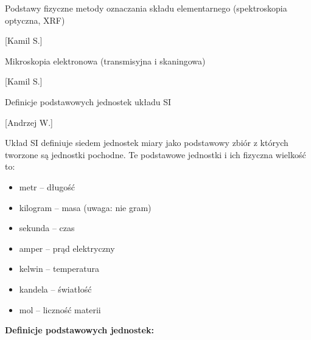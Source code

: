 \documentclass{article}
\begin{document}
\begin{enumerate}
{\Large \bf  \item Podstawy fizyczne metody oznaczania składu elementarnego (spektroskopia
optyczna, XRF)} [Kamil S.]

{\Large \bf  \item Mikroskopia elektronowa (transmisyjna i skaningowa)} [Kamil S.]

{\Large \bf  \item Definicje podstawowych jednostek układu SI} [Andrzej W.]

Układ SI definiuje siedem jednostek miary jako podstawowy zbiór z których tworzone są jednostki pochodne. Te podstawowe jednostki i ich fizyczna wielkość to:
\begin{itemize}
\item    metr – długość
\item     kilogram – masa (uwaga: nie gram)
\item     sekunda – czas
\item     amper – prąd elektryczny
\item     kelwin – temperatura
\item     kandela – światłość
\item     mol – liczność materii
\end{itemize}

{\bf Definicje podstawowych jednostek:}


\end{enumerate}
\end{document}
